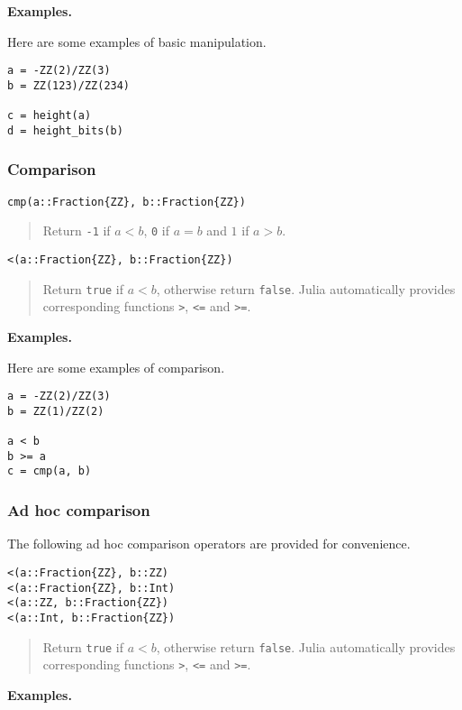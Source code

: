\documentclass[a4paper,10pt]{article}
\newcommand{\code}{\lstinline}
\newcommand{\desc}[1]{\vspace{-3mm}\begin{quote}#1\end{quote}}
\begin{document}
{{\textbf{Examples.}

Here are some examples of basic manipulation.

\begin{lstlisting}
a = -ZZ(2)/ZZ(3)
b = ZZ(123)/ZZ(234)

c = height(a)
d = height_bits(b)
\end{lstlisting}

\subsubsection{Comparison}

\begin{lstlisting}
cmp(a::Fraction{ZZ}, b::Fraction{ZZ}) 
\end{lstlisting}

\desc{Return \code{-1} if $a < b$, \code{0} if $a = b$ and $1$ if $a > b$.}

\begin{lstlisting}
<(a::Fraction{ZZ}, b::Fraction{ZZ}) 
\end{lstlisting}

\desc{Return \code{true} if $a < b$, otherwise return \code{false}. Julia
automatically provides corresponding functions \code{>}, \code{<=} and
\code{>=}.}

\textbf{Examples.}

Here are some examples of comparison.

\begin{lstlisting}
a = -ZZ(2)/ZZ(3)
b = ZZ(1)/ZZ(2)

a < b
b >= a
c = cmp(a, b)
\end{lstlisting}

\subsubsection{Ad hoc comparison}

The following ad hoc comparison operators are provided for convenience.

\begin{lstlisting}
<(a::Fraction{ZZ}, b::ZZ)
<(a::Fraction{ZZ}, b::Int)
<(a::ZZ, b::Fraction{ZZ})
<(a::Int, b::Fraction{ZZ})
\end{lstlisting}

\desc{Return \code{true} if $a < b$, otherwise return \code{false}. Julia
automatically provides corresponding functions \code{>}, \code{<=} and
\code{>=}.}

\textbf{Examples.}

}}
\end{document}
